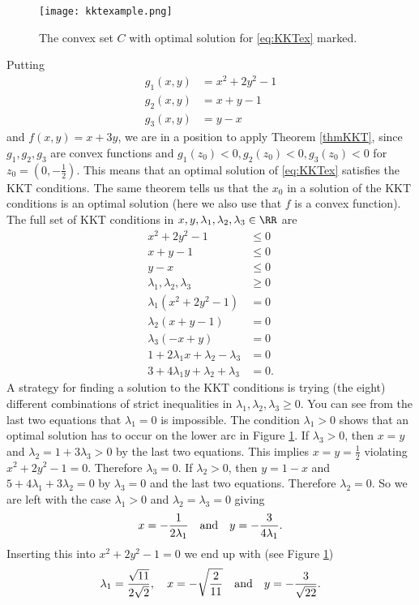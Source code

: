 \documentclass{article}
\begin{document}
\begin{figure}\label{fig:KKTexample}
\texttt{[image: kktexample.png]}
  \caption{The convex set $C$ with optimal solution for
    \eqref{eq:KKTex} marked.}
\end{figure}

Putting
\begin{align*}
  g_1(x, y) &= x^2 + 2 y^2 -1\\
  g_2(x, y) &= x + y  - 1\\
  g_3(x, y) &= y - x
\end{align*}
and $f(x, y) = x + 3y$, we are in a position to apply Theorem
\ref{thmKKT}, since $g_1, g_2, g_3$ are convex functions and
$g_1(z_0) < 0, g_2(z_0)<0, g_3(z_0)<0$ for $z_0 = (0,
-\frac{1}{2})$. This means that an optimal solution of
\eqref{eq:KKTex} satisfies the KKT conditions. The same theorem tells
us that the $x_0$ in a solution of the KKT conditions is an optimal
solution (here we also use that $f$ is a convex function). The full
set of KKT conditions in
$x, y, \lambda_1, \lambda_2, \lambda_3\in \RR$ are
\begin{align*}
  x^2 + 2y^2 -1 &\leq 0\\
  x + y -1&\leq 0\\
  y - x&\leq 0\\
  \lambda_1, \lambda_2, \lambda_3 & \geq 0\\
  \lambda_1 (x^2 + 2y^2 -1) &=0\\
  \lambda_2 (x+y -1) &= 0\\
  \lambda_3 (-x + y) &= 0\\
  1 + 2 \lambda_1 x + \lambda_2 - \lambda_3 &= 0\\
  3 + 4\lambda_1 y + \lambda_2 +\lambda_3 &= 0.
\end{align*}
A strategy for finding a solution to the KKT conditions is trying (the
eight) different combinations of strict inequalities in $\lambda_1,
\lambda_2, \lambda_3\geq 0$. You can see from the last two equations
that $\lambda_1 = 0$ is impossible. The condition $\lambda_1 > 0$
shows that an optimal solution has to occur on the lower arc in
Figure \ref{fig:KKTexample}. If $\lambda_3 > 0$, then $x = y$ and
$\lambda_2 = 1+3 \lambda_3 > 0$ by the last two equations. This
implies $x = y = \frac{1}{2}$ violating $x^2 + 2 y^2 - 1 =
0$. Therefore $\lambda_3 = 0$. If $\lambda_2 > 0$, then $y=1-x$ and $5
+ 4 \lambda_1 + 3 \lambda_2 = 0$ by $\lambda_3 = 0$ and the last two
equations. Therefore $\lambda_2=0$. So we are left with the case
$\lambda_1 > 0$ and $\lambda_2 = \lambda_3 = 0$ giving
\begin{equation*}
  x = -\frac{1}{2\lambda_1}\quad\text{and}\quad   y = -\frac{3}{4 \lambda_1}.
\end{equation*}
Inserting this into $x^2 + 2 y^2 - 1 = 0$ we end up with (see
Figure \ref{fig:KKTexample})
\begin{equation*}
  \lambda_1 = \frac{\sqrt{11}}{2 \sqrt{2}},\quad x =
  -\sqrt{\frac{2}{11}}
  \quad\text{and}\quad y = -\frac{3}{\sqrt{22}}.
\end{equation*}
\end{document}

